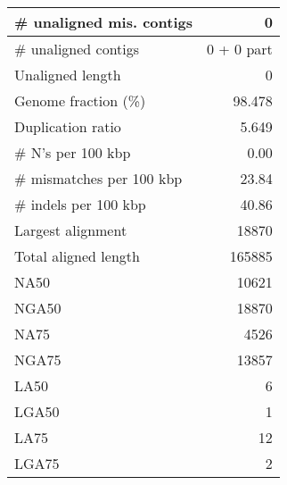 \documentclass[12pt,a4paper]{article}
\begin{document}
\begin{table}[ht]
\begin{center}
\begin{tabular}{|l*{1}{|r}|}
\# unaligned mis. contigs & 0 \\ \hline
\# unaligned contigs & 0 + 0 part \\ \hline
Unaligned length & 0 \\ \hline
Genome fraction (\%) & 98.478 \\ \hline
Duplication ratio & 5.649 \\ \hline
\# N's per 100 kbp & 0.00 \\ \hline
\# mismatches per 100 kbp & 23.84 \\ \hline
\# indels per 100 kbp & 40.86 \\ \hline
Largest alignment & 18870 \\ \hline
Total aligned length & 165885 \\ \hline
NA50 & 10621 \\ \hline
NGA50 & 18870 \\ \hline
NA75 & 4526 \\ \hline
NGA75 & 13857 \\ \hline
LA50 & 6 \\ \hline
LGA50 & 1 \\ \hline
LA75 & 12 \\ \hline
LGA75 & 2 \\ \hline
\end{tabular}
\end{center}
\end{table}
\end{document}
